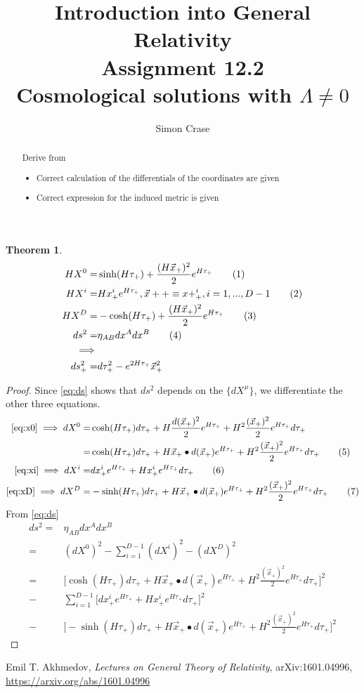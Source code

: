 \documentclass[]{article}
\title{Introduction into General Relativity\\Assignment 12.2\\Cosmological solutions with $\Lambda\ne 0$}
\author{Simon Crase}
\newtheorem{theorem}{Theorem}
\newcommand\numberthis{\addtocounter{equation}{1}\tag{\theequation}}
\begin{document}
\maketitle

\begin{abstract}
	Derive \cite[XII,(332)]{Akhmedov2017} from \cite[XII,(333)]{Akhmedov2017}
	\begin{itemize}
		\item     Correct calculation of the differentials of the coordinates are given
		\item Correct expression for the induced metric is given
	\end{itemize}
\end{abstract}

\begin{theorem}
	\begin{align*}
	HX^0=&\sinh(H\tau_+)+\frac{(H\vec{x}_+)^2}{2}e^{H\tau_+}\numberthis\label{eq:x0}\\
	HX^i=&Hx^i_+e^{H\tau_+}, \vec{x}++\equiv x+^i_+, i=1,...,D-1\numberthis\label{eq:xi}\\
	HX^D=&-\cosh(H\tau_+)+\frac{(H\vec{x}_+)^2}{2}e^{H\tau_+}\numberthis\label{eq:xD}\\
	ds^2=&\eta_{AB}dx^Adx^B\numberthis\label{eq:ds}\\
	\implies&\\
	ds^2_+=&d\tau^2_+ - e^{2H\tau_+}\vec{x}^2_+	
	\end{align*}
\end{theorem}
\begin{proof}
	Since \eqref{eq:ds} shows that $ds^2$ depends on the $\{dX^{\mu}\}$, we differentiate the other three equations.
	\begin{align*}
	\text{\eqref{eq:x0}}\implies dX^0=&\cosh(H\tau_+)d\tau_+ +H\frac{d(\vec{x}_+)^2}{2}e^{H\tau_+}+H^2\frac{(\vec{x}_+)^2}{2}e^{H\tau_+}d\tau_+\\
	=&\cosh(H\tau_+)d\tau_+ +H\vec{x}_+\bullet d(\vec{x}_+)e^{H\tau_+}+H^2\frac{(\vec{x}_+)^2}{2}e^{H\tau_+}d\tau_+\numberthis\label{eq:dx0}\\
	\eqref{eq:xi}\implies	dX^i=&dx^i_+e^{H\tau_+} + H x^i_+e^{H\tau_+}d\tau_+\numberthis\label{eq:dxi}\\
	\eqref{eq:xD}\implies dX^D=&-\sinh(H\tau_+)d\tau_+ +H\vec{x}_+\bullet d(\vec{x}_+)e^{H\tau_+} +H^2 \frac{(\vec{x}_+)^2}{2}e^{H\tau_+}d\tau_+ \numberthis\label{eq:dxD}
	\end{align*}
	From \eqref{eq:ds}
	\begin{align*}
	ds^2=&\eta_{AB}dx^Adx^B\\
	=&(dX^0)^2- \sum_{i=1}^{D-1}(dX^i)^2-(dX^D)^2\\
	=&\big[\cosh(H\tau_+)d\tau_+ +H\vec{x}_+\bullet d(\vec{x}_+)e^{H\tau_+}+H^2\frac{(\vec{x}_+)^2}{2}e^{H\tau_+}d\tau_+\big]^2\\
	-& \sum_{i=1}^{D-1}\big[dx^i_+e^{H\tau_+} + H x^i_+e^{H\tau_+}d\tau_+\big]^2\\
	-&\big[-\sinh(H\tau_+)d\tau_+ +H\vec{x}_+\bullet d(\vec{x}_+)e^{H\tau_+} +H^2\frac{(\vec{x}_+)^2}{2}e^{H\tau_+}d\tau_+\big]^2
	\end{align*}
\end{proof}
\begin{thebibliography}{9}\label{section:biblio}
	\raggedright
	Emil T. Akhmedov,
	\emph{Lectures on General Theory of Relativity},
	arXiv:1601.04996,
	\url{https://arxiv.org/abs/1601.04996}
\end{thebibliography}
\end{document}
